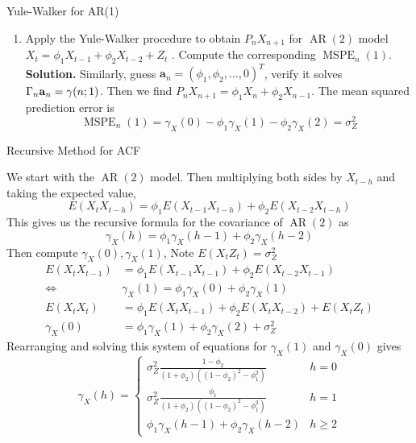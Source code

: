 \documentclass{article}
\DeclareMathOperator{\ar}{AR}
\DeclareMathOperator{\mspe}{MSPE}
\begin{document}
\begin{multicols*}{3}
\begin{blackbox}{Yule-Walker for AR(1)}
\begin{enumerate}[label=\alph*),leftmargin=6pt]
    \item Apply the Yule-Walker procedure to obtain $P_nX_{n+1}$ for $\ar(2)$ model $X_t = \phi_1X_{t-1}+\phi_2X_{t-2} +Z_t$ . Compute
    the corresponding $\mspe_n(1)$. \textbf{Solution.} Similarly, guess $\textbf{a}_n = (\phi_1, \phi_2, \ldots, 0)^T$, verify it solves $\Gamma_n\textbf a_n = \gamma(n;1)$. Then we find $P_nX_{n+1} = \phi_1X_n + \phi_2X_{n-1}$. The mean squared prediction error is
    \[\mspe_n(1) = \gamma_X(0) - \phi_1\gamma_X(1) - \phi_2\gamma_X(2) = \sigma_Z^2\]
\end{enumerate}
\end{blackbox}

\begin{blackbox}{Recursive Method for ACF}

    We start with the $\ar(2)$ model. Then multiplying both sides by $X_{t-h}$ and taking the expected value,
    \[E(X_tX_{t-h}) = \phi_1E(X_{t-1}X_{t-h}) + \phi_2E(X_{t-2}X_{t-h})\]
    This gives us the recursive formula for the covariance of $\ar(2)$ as\\[-3ex] 
    \[\gamma_X(h) = \phi_1\gamma_X(h-1) + \phi_2\gamma_X(h-2)\]
    Then compute $\gamma_X(0), \gamma_X(1)$, Note $E(X_tZ_t) = \sigma_Z^2$
    \begin{align*}
        E(X_tX_{t-1}) &= \phi_1E(X_{t-1}X_{t-1}) + \phi_2E(X_{t-2}X_{t-1})\\
        \iff& \gamma_X(1) = \phi_1\gamma_X(0) + \phi_2\gamma_X(1)\\
        E(X_tX_t) &= \phi_1E(X_tX_{t-1}) + \phi_2E(X_tX_{t-2}) + E(X_tZ_t)\\
        \gamma_X(0) &= \phi_1\gamma_X(1) +  \phi_2\gamma_X(2) + \sigma_Z^2
    \end{align*}
    Rearranging and solving this system of equations for $\gamma_X(1)$ and $\gamma_X(0)$ gives 
    \[\gamma_X(h) = \begin{cases}
        \sigma_Z^2 \frac{1-\phi_2}{(1+\phi_2)((1-\phi_2)^2 - \phi_1^2)} & h = 0\\
        \sigma_Z^2 \frac{\phi_1}{(1+\phi_2)((1-\phi_2)^2 - \phi_1^2)} & h = 1\\
        \phi_1\gamma_X(h-1) + \phi_2\gamma_X(h-2) & h \geq 2
    \end{cases}\]       
\end{blackbox}


\end{multicols*}
\end{document}
